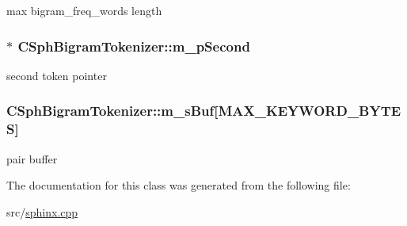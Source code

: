 max bigram\-\_\-freq\-\_\-words length 

\hypertarget{classCSphBigramTokenizer_ab0f20a5139727c93bf3b4a4d9bb1eeaa}{
\subsubsection[{m\-\_\-p\-Second}]{$\ast$ C\-Sph\-Bigram\-Tokenizer\-::m\-\_\-p\-Second\hspace{0.3cm}{\ttfamily [protected]}}}\label{classCSphBigramTokenizer_ab0f20a5139727c93bf3b4a4d9bb1eeaa}


second token pointer 

\hypertarget{classCSphBigramTokenizer_abd50444095d9fc8a7436e4bf8066d0d8}{
\subsubsection[{m\-\_\-s\-Buf}]{ C\-Sph\-Bigram\-Tokenizer\-::m\-\_\-s\-Buf\mbox{[}{\bf M\-A\-X\-\_\-\-K\-E\-Y\-W\-O\-R\-D\-\_\-\-B\-Y\-T\-E\-S}\mbox{]}\hspace{0.3cm}{\ttfamily [protected]}}}\label{classCSphBigramTokenizer_abd50444095d9fc8a7436e4bf8066d0d8}


pair buffer 



The documentation for this class was generated from the following file\-:\begin{DoxyCompactItemize}
\item 
src/\hyperlink{sphinx_8cpp}{sphinx.\-cpp}\end{DoxyCompactItemize}
